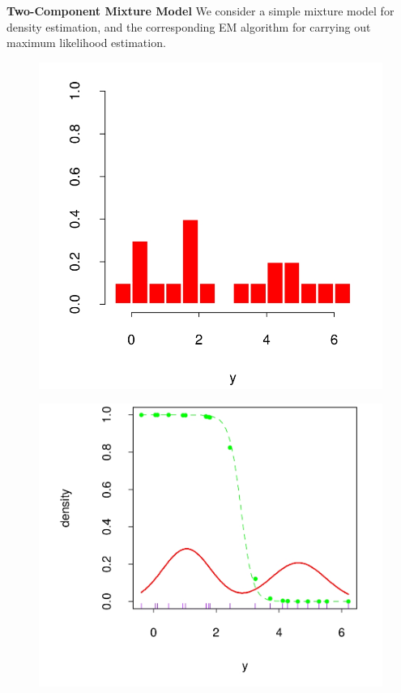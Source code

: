 \documentclass[11pt]{beamer}
\begin{document}
\begin{frame}
\textbf{Two-Component Mixture Model}\linebreak
\textsf{We consider a simple mixture model for density estimation,
and the corresponding EM algorithm for carrying out maximum likelihood
estimation.}



\begin{figure}
\begin{flushleft}
\includegraphics[scale=0.2]{fig1.jpg}
\label{Histogram of data}
\end{flushleft}



\begin{flushright}
\includegraphics[scale=0.2]{fig2.jpg}
\label{Maximum likelihood fit
of Gaussian densities (solid red) and
responsibility (dotte green) of the left
component density for observation y,
as a function of y}
\end{flushright}
\end{figure}

\end{frame}
\end{document}
